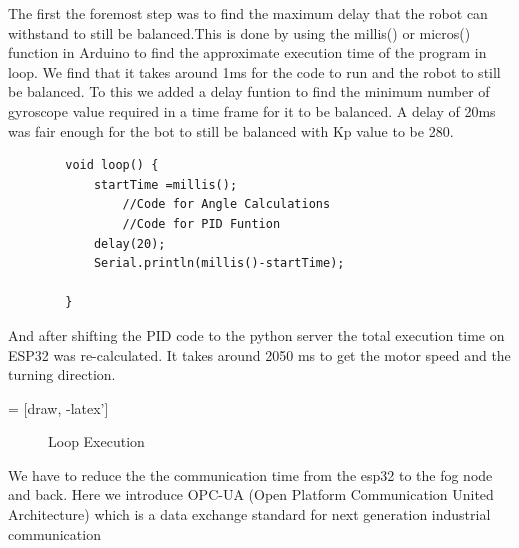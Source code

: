 \documentclass{article}
\begin{document}
     The first the foremost step was to find the maximum delay that the robot can withstand to still be balanced.This is done by using the millis() or micros() function in Arduino to find the approximate execution time of the program in loop. 
     We find that it takes around 1ms for the code to run and the robot to still be balanced. To this we added a delay funtion to find the minimum number of gyroscope value required in a time frame for it to be balanced.
     A delay of 20ms was fair enough for the bot to still be balanced with Kp value to be 280. 
     \begin{lstlisting}
		void loop() {
  			startTime =millis();
				//Code for Angle Calculations
				//Code for PID Funtion  
  			delay(20);
  			Serial.println(millis()-startTime);
  
		}
		\end{lstlisting}
       
	And after shifting the PID code to the python server the total execution time on ESP32 was re-calculated. It takes around 2050 ms to get the motor speed and the turning direction. 

  	 = [draw, -latex']


\begin{figure}[!htb]
\centering
{}
\caption{Loop Execution}
\label{fig:dummy}
\end {figure}

We have to reduce the the communication time from the esp32 to the fog node and back. Here we introduce OPC-UA (Open Platform Communication United Architecture) which is a data exchange standard for next generation industrial communication
\end{document}
